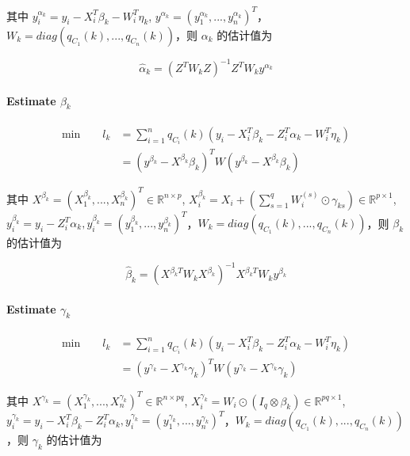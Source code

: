 \documentclass[12pt, a4paper, oneside]{article}
\numberwithin{equation}{section}
\begin{document}
其中 $y_i^{\alpha_k} = y_i - X_i^T \beta_k - W_i^T \eta_k$, $y^{\alpha_k} = (y_1^{\alpha_k},...,y_n^{\alpha_k})^T$，$W_k = diag(q_{C_1}(k),...,q_{C_n}(k))$，则 $\alpha_k$ 的估计值为

\begin{equation}
	\hat \alpha_k = (Z^T W_k Z)^{-1}Z^T W_k y^{\alpha_k}
\end{equation}

\paragraph{Estimate $\beta_k$}

\begin{equation}
	\begin{aligned}
		\text{min}\qquad l_k &=  \displaystyle\sum_{i=1}^{n}q_{C_i}(k)\left(y_i - X_i^T \beta_k - Z_i^T \alpha_k - W_i^T \eta_k\right) \\
		&= (y^{\beta_k} - X^{\beta_k}\beta_k)^T W (y^{\beta_k} - X^{\beta_k}\beta_k)
	\end{aligned}
\end{equation}

其中 $X^{\beta_k} = (X^{\beta_k}_1,...,X^{\beta_k}_n)^T \in \mathbb{R}^{n\times p}$, $X^{\beta_k}_i = X_i + (\sum_{s=1}^{q}W_i^{(s)}\odot\gamma_{ks}) \in \mathbb{R}^{p\times 1}$, $y_i^{\beta_k} = y_i - Z_i^T\alpha_k, y_i^{\beta_k} = (y_1^{\beta_k},...,y_n^{\beta_k})^T$，$W_k = diag(q_{C_1}(k),...,q_{C_n}(k))$，则 $\beta_k$ 的估计值为

\begin{equation}
	\hat \beta_k = (X^{\beta_k T} W_k X^{\beta_k})^{-1} X^{\beta_k T} W_k y^{\beta_k}
\end{equation}

\paragraph{Estimate $\gamma_k$}

\begin{equation}
	\begin{aligned}
		\text{min}\qquad l_k &=  \displaystyle\sum_{i=1}^{n}q_{C_i}(k)\left(y_i - X_i^T \beta_k - Z_i^T \alpha_k - W_i^T \eta_k\right) \\
		&= (y^{\gamma_k} - X^{\gamma_k}\gamma_k)^T W (y^{\gamma_k} -  X^{\gamma_k}\gamma_k)
	\end{aligned}
\end{equation}

其中 $X^{\gamma_k} = (X^{\gamma_k}_1,...,X^{\gamma_k}_n)^T \in \mathbb{R}^{n\times pq}$, $X^{\gamma_k}_i = W_i\odot (I_q \otimes \beta_k) \in \mathbb{R}^{pq\times 1}$, $y_i^{\gamma_k} = y_i - X_i^T\beta_k - Z_i^T\alpha_k, y_i^{\gamma_k} = (y_1^{\gamma_k},...,y_n^{\gamma_k})^T$，$W_k = diag(q_{C_1}(k),...,q_{C_n}(k))$，则 $\gamma_k$ 的估计值为
\end{document}
